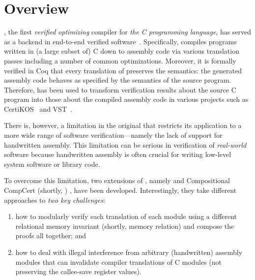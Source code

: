 \chapter{\;\;\;\;Overview}\label{sec:overview}



\cc{} \cite{CompCert, Compcert-CACM}, the first \emph{verified}
\emph{optimizing} compiler for \emph{the C programming language}, has
served as a backend in end-to-end verified
software~\cite{appel2014program}. Specifically, \cc{} compiles programs written in (a
large subset of) C down to assembly code via various translation
passes including a number of common optimizations.  Moreover, it is
formally verified in Coq that every translation of \cc{} preserves the
semantics: the generated assembly code behaves as specified by the
semantics of the source program. Therefore, \cc{} has been used to
transform verification results about the source C program into those
about the compiled assembly code in various projects such as
CertiKOS~\cite{CertiKOS11, CertiKOS16} and VST~\cite{VST}.

There is, however, a limitation in the original \cc{} that restricts
its application to a more wide range of software verification---namely
the lack of support for handwritten assembly. This
limitation can be serious in verification of \emph{real-world}
software because handwritten assembly is often crucial for writing
low-level system software or library code.

To overcome this limitation, two extensions of \cc{}, namely \ccx{}
\cite{gu:dscal,wang:saccx} and Compositional CompCert (shortly, \ccc{}) \cite{beringer:isem,stewart:ccc}, have
been developed. Interestingly, they take different approaches to
\emph{two key challenges}:
\begin{enumerate}
\item how to modularly verify each translation of each
module using a different relational memory invariant (shortly, memory relation) and compose the proofs all
together; and
\item how to deal with illegal interference from
arbitrary (handwritten) assembly modules that can invalidate compiler
translations of C modules (\eg not preserving the
callee-save register values).
\end{enumerate}

